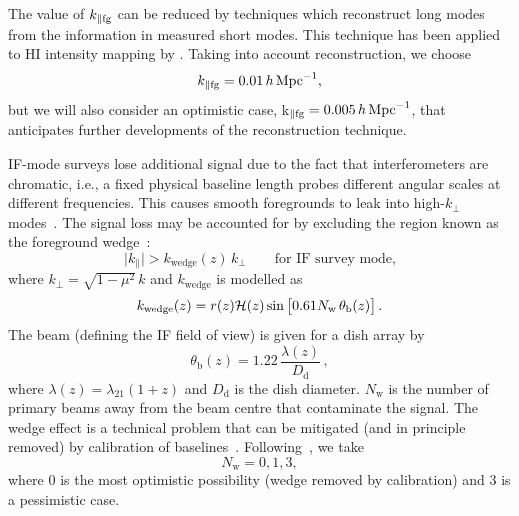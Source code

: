The value of $k_{\| \mathrm{fg}}$ can be reduced by techniques which reconstruct long modes from the information in measured short modes. This technique has been applied to HI intensity mapping by \cite{Zhu:2016esh,Modi:2019hnu}. Taking into account reconstruction, we choose 
\begin{equation} \label{kfgpar}
k_{\| \mathrm{fg}} = 0.01 \,h\,{\mathrm{Mpc}}^{-1},
\end{equation}
{but we will also consider an optimistic case, k$_{\| \mathrm{fg}} = 0.005 \,h\,{\mathrm{Mpc}}^{-1}$, that anticipates further developments of the reconstruction technique.}

IF-mode surveys lose additional signal due to the fact that {interferometers are chromatic, i.e., a fixed physical baseline length probes different angular scales at different frequencies.} This causes smooth foregrounds to leak into high-$k_{\perp}$ modes~\cite{Obuljen:2017jiy,Alonso:2017dgh,Ansari:2018ury}. The signal loss may be accounted for by excluding
the region known as the foreground wedge~\cite{Pober:2014lva, Pober:2013jna}: 
\begin{equation} \label{e2.19}
\big|k_{\parallel}\big| > k_{\mathrm{wedge}}(z)\,k_{\perp} \qquad \mbox{for IF survey mode,}
\end{equation} 
where $k_\perp=\sqrt{1-\mu^2}\,k$ and  $k_{\mathrm{wedge}}$ is modelled as
\begin{equation}
k_{\mathrm{wedge}}(z) = r(z)\mathcal{H}(z) \sin{\big[0.61N_{\mathrm{w}}\,{\theta_{\mathrm{b}}(z)}\big]} \, . \label{e2.20} 
\end{equation}
{The beam (defining the IF field of view) is given for a dish array by
\begin{equation}\label{thetab}
\theta_{\mathrm b}(z) = 1.22 \,\frac{\lambda(z)}{D_{\mathrm d}}\,,
\end{equation}
where $\lambda(z)=\lambda_{21}(1+z)$ and $D_{\mathrm d}$ is the dish diameter.
$N_{\mathrm{w}}$ is the number of primary beams away from the beam centre that contaminate the signal. The wedge effect is a technical problem that can be mitigated (and  in principle removed) by calibration of baselines~\cite{Ghosh:2017woo}.}
Following~\cite{Karagiannis:2019jjx}, we take
\begin{equation}
N_{\mathrm{w}}= 0, 1, 3, 
\end{equation}
where 0 is the most optimistic possibility (wedge removed by calibration)  and 3 is a pessimistic case. 
%
%
